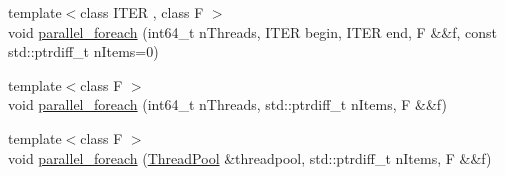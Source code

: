 \begin{DoxyCompactItemize}
{\footnotesize template$<$class I\+T\+E\+R , class F $>$ }\\void \hyperlink{group__ParallelProcessing_gae081bc77f03a070b9fe0f97966949f58}{parallel\+\_\+foreach} (int64\+\_\+t n\+Threads, I\+T\+E\+R begin, I\+T\+E\+R end, F \&\&f, const std\+::ptrdiff\+\_\+t n\+Items=0)
\item 
{\footnotesize template$<$class F $>$ }\\void \hyperlink{group__ParallelProcessing_ga900cd2b90fda714e21082d5ba897f240}{parallel\+\_\+foreach} (int64\+\_\+t n\+Threads, std\+::ptrdiff\+\_\+t n\+Items, F \&\&f)
\item 
{\footnotesize template$<$class F $>$ }\\void \hyperlink{group__ParallelProcessing_gaf78ef995aaa44624da018033fd03beeb}{parallel\+\_\+foreach} (\hyperlink{classnifty_1_1parallel_1_1ThreadPool}{Thread\+Pool} \&threadpool, std\+::ptrdiff\+\_\+t n\+Items, F \&\&f)
\end{DoxyCompactItemize}
